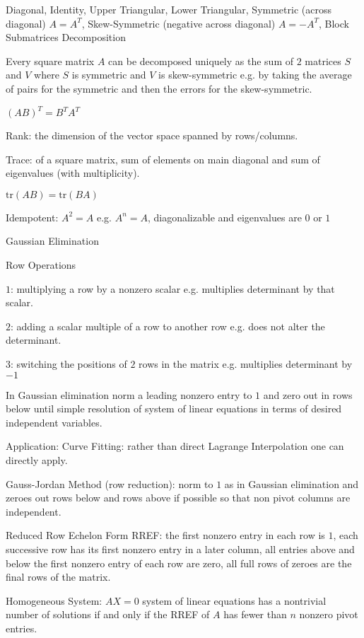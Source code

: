 Diagonal, Identity, Upper Triangular, Lower Triangular, Symmetric (across diagonal) $A=A^T$, Skew-Symmetric (negative across diagonal) $A=-A^T$, Block Submatrices Decomposition

Every square matrix $A$ can be decomposed uniquely as the sum of $2$ matrices $S$ and $V$ where $S$ is symmetric and $V$ is skew-symmetric e.g. by taking the average of pairs for the symmetric and then the errors for the skew-symmetric.

$(AB)^T=B^T A^T$

Rank: the dimension of the vector space spanned by rows/columns.

Trace: of a square matrix, sum of elements on main diagonal and sum of eigenvalues (with multiplicity).

$\text{tr}(AB)=\text{tr}(BA)$

Idempotent: $A^2=A$ e.g. $A^n=A$, diagonalizable and eigenvalues are $0$ or $1$

Gaussian Elimination

Row Operations

$1$: multiplying a row by a nonzero scalar e.g. multiplies determinant by that scalar.

$2$: adding a scalar multiple of a row to another row e.g. does not alter the determinant.

$3$: switching the positions of $2$ rows in the matrix e.g. multiplies determinant by $-1$

In Gaussian elimination norm a leading nonzero entry to $1$ and zero out in rows below until simple resolution of system of linear equations in terms of desired independent variables.

Application: Curve Fitting: rather than direct Lagrange Interpolation one can directly apply.

Gauss-Jordan Method (row reduction): norm to $1$ as in Gaussian elimination and zeroes out rows below and rows above if possible so that non pivot columns are independent.

Reduced Row Echelon Form RREF: the first nonzero entry in each row is $1$, each successive row has its first nonzero entry in a later column, all entries above and below the first nonzero entry of each row are zero, all full rows of zeroes are the final rows of the matrix.

Homogeneous System: $AX=0$ system of linear equations has a nontrivial number of solutions if and only if the RREF of $A$ has fewer than $n$ nonzero pivot entries.

